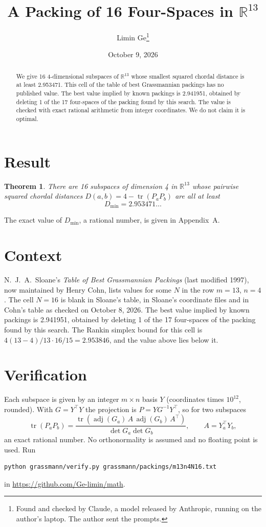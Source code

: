 \documentclass[11pt,a4paper]{article}
\title{A Packing of 16 Four-Spaces in $\mathbb{R}^{13}$}
\author{Limin Ge\thanks{Found and checked by Claude, a model released by Anthropic, running on the author's laptop. The author sent the prompts.}}
\date{October 9, 2026}
\newtheorem*{theorem}{Theorem}
\begin{document}
\maketitle
\begin{abstract}
We give 16 4-dimensional subspaces of $\mathbb{R}^{13}$ whose smallest squared chordal distance is at least 2.953471. This cell of the table of best Grassmannian packings has no published value. The best value implied by known packings is 2.941951, obtained by deleting 1 of the 17 four-spaces of the packing found by this search. The value is checked with exact rational arithmetic from integer coordinates. We do not claim it is optimal.
\end{abstract}

\section{Result}
\begin{theorem}
There are 16 subspaces of dimension 4 in $\mathbb{R}^{13}$ whose pairwise squared chordal distances $D(a,b) = 4 - \operatorname{tr}(P_aP_b)$ are all at least
\[ D_{\min} = 2.953471\ldots \]
\end{theorem}
The exact value of $D_{\min}$, a rational number, is given in Appendix~A.


\section{Context}
N.~J.~A.~Sloane's \emph{Table of Best Grassmannian Packings} (last modified 1997), now maintained by Henry Cohn, lists values for some $N$ in the row $m=13$, $n=4$. The cell $N=16$ is blank in Sloane's table, in Sloane's coordinate files and in Cohn's table as checked on October 8, 2026. The best value implied by known packings is 2.941951, obtained by deleting 1 of the 17 four-spaces of the packing found by this search. The Rankin simplex bound for this cell is $4(13-4)/13\cdot 16/15 = 2.953846$, and the value above lies below it.


\section{Verification}
Each subspace is given by an integer $m\times n$ basis $Y$ (coordinates times $10^{12}$, rounded). With $G=Y^\top Y$ the projection is $P=YG^{-1}Y^\top$, so for two subspaces
\[ \operatorname{tr}(P_aP_b)=\frac{\operatorname{tr}(\operatorname{adj}(G_a)\,A\,\operatorname{adj}(G_b)\,A^\top)}{\det G_a\det G_b},\qquad A=Y_a^\top Y_b, \]
an exact rational number. No orthonormality is assumed and no floating point is used. Run
\begin{verbatim}
python grassmann/verify.py grassmann/packings/m13n4N16.txt
\end{verbatim}
in \url{https://github.com/Ge-limin/math}.
\end{document}
